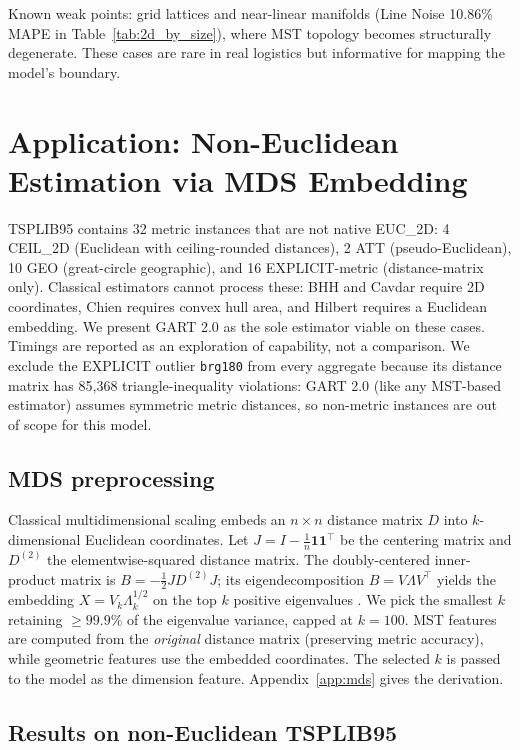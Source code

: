 Known weak points: grid lattices and near-linear manifolds (Line Noise 10.86\% MAPE in Table~\ref{tab:2d_by_size}), where MST topology becomes structurally degenerate. These cases are rare in real logistics but informative for mapping the model's boundary.

\section{Application: Non-Euclidean Estimation via MDS Embedding} \label{sec:application}

TSPLIB95 contains 32 metric instances that are not native EUC\_2D: 4 CEIL\_2D (Euclidean with ceiling-rounded distances), 2 ATT (pseudo-Euclidean), 10 GEO (great-circle geographic), and 16 EXPLICIT-metric (distance-matrix only). Classical estimators cannot process these: BHH and Cavdar require 2D coordinates, Chien requires convex hull area, and Hilbert requires a Euclidean embedding. We present GART 2.0 as the sole estimator viable on these cases. Timings are reported as an exploration of capability, not a comparison. We exclude the EXPLICIT outlier \texttt{brg180} from every aggregate because its distance matrix has 85{,}368 triangle-inequality violations: GART 2.0 (like any MST-based estimator) assumes symmetric metric distances, so non-metric instances are out of scope for this model.

\subsection{MDS preprocessing}

Classical multidimensional scaling \citep{torgerson1952mds,borg2005mds} embeds an $n \times n$ distance matrix $D$ into $k$-dimensional Euclidean coordinates. Let $J = I - \tfrac{1}{n}\mathbf{1}\mathbf{1}^\top$ be the centering matrix and $D^{(2)}$ the elementwise-squared distance matrix. The doubly-centered inner-product matrix is $B = -\tfrac{1}{2} J D^{(2)} J$; its eigendecomposition $B = V \Lambda V^\top$ yields the embedding $X = V_k \Lambda_k^{1/2}$ on the top $k$ positive eigenvalues \citep{cox2000mds}. We pick the smallest $k$ retaining $\ge 99.9\%$ of the eigenvalue variance, capped at $k = 100$. MST features are computed from the \emph{original} distance matrix (preserving metric accuracy), while geometric features use the embedded coordinates. The selected $k$ is passed to the model as the dimension feature. Appendix~\ref{app:mds} gives the derivation.

\subsection{Results on non-Euclidean TSPLIB95}

